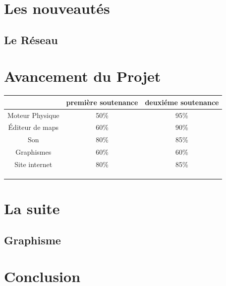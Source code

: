 \documentclass [11pt]{report}
\begin{document}
\chapter{Les nouveaut\'es}
	\section{Le R\'eseau}
\chapter{Avancement du Projet}
	\begin{tabular}{|c|c|c|}
	\hline  & premi\`ere soutenance & deuxi\'eme soutenance \\ 
	\hline Moteur Physique & 50\% & 95\% \\ 
	\hline \'Editeur de maps & 60\% & 90\% \\ 
	\hline Son & 80\% & 85\% \\ 
	\hline Graphismes & 60\% & 60\% \\ 
	\hline Site internet & 80\% & 85\% \\ 
	\hline  &  &  \\ 
	\hline  &  &  \\ 
	\hline  &  &  \\ 
	\hline 
	\end{tabular} 
\chapter{La suite}
	\section{Graphisme}
\chapter*{Conclusion}
\end{document}
